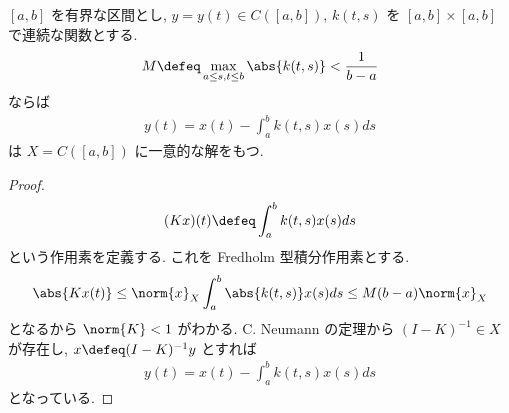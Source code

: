 \documentclass[openany, a4paper, oneside]{jsbook}
\begin{document}
\begin{ex}
$[a, b]$ を有界な区間とし, $y = y(t) \in C([a, b])$,
$k(t, s)$ を $[a, b] \times [a,b]$ で連続な関数とする.
\begin{align}
 M
 \defeq
 \max_{a \leq s, t \leq b} \abs{k(t, s)}
 <
 \frac{1}{b-a}
\end{align}
ならば
\begin{align}
 y(t)
 =
 x(t) - \int_a^b k(t, s) x(s) ds
\end{align}
は $X = C([a, b])$ に一意的な解をもつ.
\end{ex}
\begin{proof}
\begin{align}
 (Kx)(t)
 \defeq
 \int_a^b k(t, s) x(s) ds
\end{align}
という作用素を定義する.
これを Fredholm 型積分作用素とする.
\begin{align}
 \abs{Kx(t)}
 \leq
 \norm{x}_X \int_a^b \abs{k(t, s)} x(s) ds
 \leq
 M (b-a) \norm{x}_X
\end{align}
となるから $\norm{K} < 1$ がわかる.
C. Neumann の定理から $(I-K)^{-1} \in X$ が存在し,
$x \defeq (I-K)^{-1} y$ とすれば
\begin{align}
 y(t)
 =
 x(t) - \int_a^b k(t, s) x(s) ds
\end{align}
となっている.
\end{proof}
\end{document}
